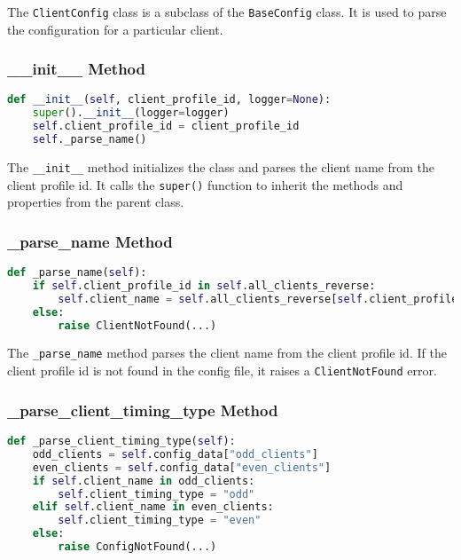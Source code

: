 The \verb|ClientConfig| class is a subclass of the \verb|BaseConfig| class. It is used to parse the configuration for a particular client.

\subsubsection{\_\_init\_\_ Method}

\begin{lstlisting}[language=Python]
def __init__(self, client_profile_id, logger=None):
    super().__init__(logger=logger)
    self.client_profile_id = client_profile_id
    self._parse_name()
\end{lstlisting}

The \verb|__init__| method initializes the class and parses the client name from the client profile id. It calls the \verb|super()| function to inherit the methods and properties from the parent class.

\subsubsection{\_parse\_name Method}

\begin{lstlisting}[language=Python]
def _parse_name(self):
    if self.client_profile_id in self.all_clients_reverse:
        self.client_name = self.all_clients_reverse[self.client_profile_id]
    else:
        raise ClientNotFound(...)
\end{lstlisting}

The \verb|_parse_name| method parses the client name from the client profile id. If the client profile id is not found in the config file, it raises a \verb|ClientNotFound| error.

\subsubsection{\_parse\_client\_timing\_type Method}

\begin{lstlisting}[language=Python]
def _parse_client_timing_type(self):
    odd_clients = self.config_data["odd_clients"]
    even_clients = self.config_data["even_clients"]
    if self.client_name in odd_clients:
        self.client_timing_type = "odd"
    elif self.client_name in even_clients:
        self.client_timing_type = "even"
    else:
        raise ConfigNotFound(...)
\end{lstlisting}


